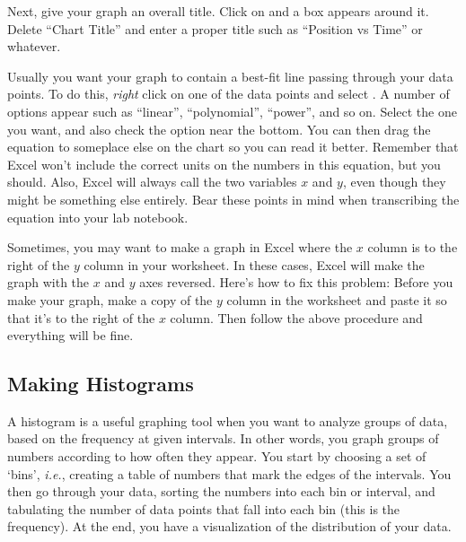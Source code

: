 Next, give your graph an overall title. Click on  and a box 
appears around it. Delete ``Chart Title'' and enter a proper title such as 
``Position vs Time'' or whatever.
\vspace{0.5cm}

Usually you want your graph to contain a best-fit line passing
through your data points.  To do this, \textit{right} click on one of the data points 
and select . A number of options appear such as 
``linear'', ``polynomial'', ``power'', and so on.  Select the one you want, 
and also check the  option near the bottom. 
You can then drag the equation to someplace else on the chart so you can read 
it better. Remember that Excel won't include the correct units on the numbers 
in this equation, but you should.  Also, Excel will always call the two 
variables $x$ and $y$, even though they might be something else entirely. Bear 
these points in mind when transcribing the equation into your lab notebook.
\vspace{0.5cm}

Sometimes, you may want to make a graph in Excel where the $x$ column
is to the right of the $y$ column in your worksheet.  In these cases,
Excel will make the graph with the $x$ and $y$ axes reversed. Here's how 
to fix this problem:  Before you make your graph,  make a copy of the $y$ 
column in the worksheet and paste it so that it's to the right of the $x$ 
column.  Then follow the above procedure and everything will be fine.

\subsection*{Making Histograms}

A histogram is a useful graphing tool when you want to analyze groups of data, based on the frequency at given intervals. 
In other words, you graph groups of numbers according to how often they appear.
You start by choosing a set of `bins', {\it i.e.}, creating a table of numbers that mark the edges of the intervals.
You then go through your data, sorting the numbers into each bin or interval, and tabulating the number of data points that fall into each bin (this is the 
frequency).
At the end, you have a visualization of the distribution of your data.   

